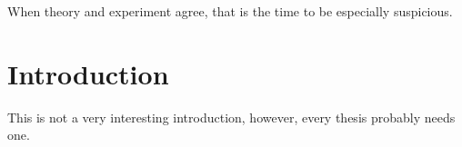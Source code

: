 \begin{savequote}[45mm]
When theory and experiment agree, 
that is the time to be especially suspicious. 
\end{savequote}

\chapter{Introduction}


This is not a very interesting introduction, however, every thesis probably
needs one.
